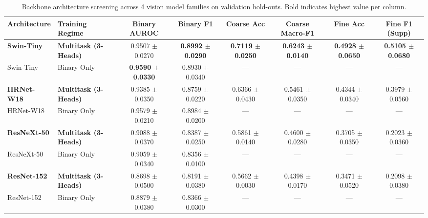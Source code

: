\documentclass[runningheads]{llncs}
\begin{document}
\begin{table}[t]
\centering
\caption{Backbone architecture screening across 4 vision model families on validation hold-outs. Bold indicates highest value per column.}
\label{tab:stage10_backbone}
\begin{adjustbox}{max width=\textwidth}
\begin{tabular}{llcccccc}
\toprule
\textbf{Architecture} & \textbf{Training Regime} & \textbf{Binary AUROC} & \textbf{Binary F1} & \textbf{Coarse Acc} & \textbf{Coarse Macro-F1} & \textbf{Fine Acc} & \textbf{Fine F1 (Supp)} \\
\midrule
\textbf{Swin-Tiny} & \textbf{Multitask (3-Heads)} & 0.9507 $\pm$ 0.0270 & \textbf{0.8992 $\pm$ 0.0290} & \textbf{0.7119 $\pm$ 0.0250} & \textbf{0.6243 $\pm$ 0.0140} & \textbf{0.4928 $\pm$ 0.0650} & \textbf{0.5105 $\pm$ 0.0680} \\
Swin-Tiny & Binary Only & \textbf{0.9590 $\pm$ 0.0330} & 0.8930 $\pm$ 0.0340 & --- & --- & --- & --- \\
\textbf{HRNet-W18} & \textbf{Multitask (3-Heads)} & 0.9385 $\pm$ 0.0350 & 0.8759 $\pm$ 0.0220 & 0.6366 $\pm$ 0.0430 & 0.5461 $\pm$ 0.0350 & 0.4344 $\pm$ 0.0340 & 0.3979 $\pm$ 0.0560 \\
HRNet-W18 & Binary Only & 0.9579 $\pm$ 0.0210 & 0.8984 $\pm$ 0.0200 & --- & --- & --- & --- \\
\textbf{ResNeXt-50} & \textbf{Multitask (3-Heads)} & 0.9088 $\pm$ 0.0370 & 0.8387 $\pm$ 0.0250 & 0.5861 $\pm$ 0.0140 & 0.4600 $\pm$ 0.0280 & 0.3705 $\pm$ 0.0350 & 0.2023 $\pm$ 0.0360 \\
ResNeXt-50 & Binary Only & 0.9059 $\pm$ 0.0340 & 0.8356 $\pm$ 0.0100 & --- & --- & --- & --- \\
\textbf{ResNet-152} & \textbf{Multitask (3-Heads)} & 0.8698 $\pm$ 0.0500 & 0.8191 $\pm$ 0.0380 & 0.5662 $\pm$ 0.0030 & 0.4398 $\pm$ 0.0170 & 0.3471 $\pm$ 0.0520 & 0.2098 $\pm$ 0.0380 \\
ResNet-152 & Binary Only & 0.8879 $\pm$ 0.0380 & 0.8366 $\pm$ 0.0300 & --- & --- & --- & --- \\
\bottomrule
\end{tabular}
\end{adjustbox}
\end{table}
\end{document}
